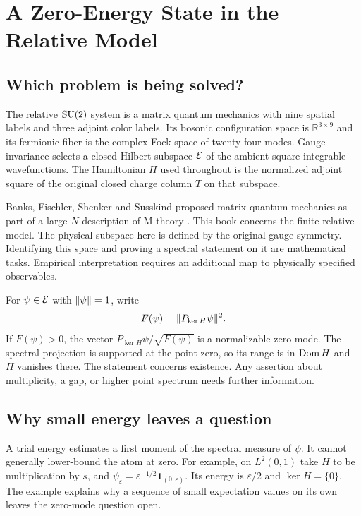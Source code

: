 \chapter{A Zero-Energy State in the Relative Model}\label{ch:question}

\section{Which problem is being solved?}
The relative $\operatorname{SU}(2)$ system is a matrix quantum mechanics with nine spatial labels and three adjoint color labels. Its bosonic configuration space is $\mathbb R^{3\times9}$ and its fermionic fiber is the complex Fock space of twenty-four modes. Gauge invariance selects a closed Hilbert subspace $\mathcal E$ of the ambient square-integrable wavefunctions. The Hamiltonian $H$ used throughout is the normalized adjoint square of the original closed charge column $T$ on that subspace.

Banks, Fischler, Shenker and Susskind proposed matrix quantum mechanics as part of a large-$N$ description of M-theory \cite{bfss}. This book concerns the finite relative model. The physical subspace here is defined by the original gauge symmetry. Identifying this space and proving a spectral statement on it are mathematical tasks. Empirical interpretation requires an additional map to physically specified observables.

For $\psi\in \mathcal E$ with $\lVert \psi\rVert=1$, write
\begin{equation}
 F(\psi)=\lVert P_{\ker H}\psi\rVert^{2}.\label{eq:fidelity}
\end{equation}
If $F(\psi)>0$, the vector $P_{\ker H}\psi/\sqrt{F(\psi)}$ is a normalizable zero mode. The spectral projection is supported at the point zero, so its range is in $\operatorname{Dom} H$ and $H$ vanishes there. The statement concerns existence. Any assertion about multiplicity, a gap, or higher point spectrum needs further information.

\section{Why small energy leaves a question}
A trial energy estimates a first moment of the spectral measure of $\psi$. It cannot generally lower-bound the atom at zero. For example, on $L^2(0,1)$ take $H$ to be multiplication by $s$, and $\psi_\varepsilon=\varepsilon^{-1/2}\mathbf 1_{(0,\varepsilon)}$. Its energy is $\varepsilon/2$ and $\ker H=\{0\}$. The example explains why a sequence of small expectation values on its own leaves the zero-mode question open.

